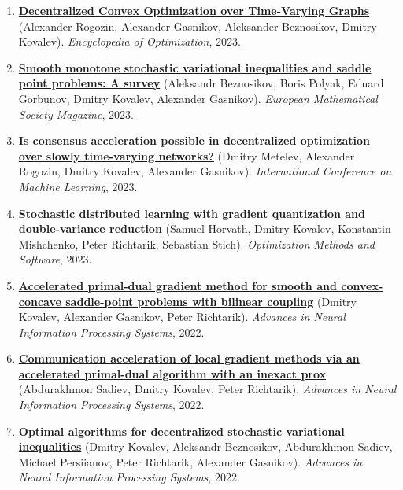 \begin{enumerate}
\item
\textbf{\href{https://link.springer.com/content/pdf/10.1007/978-3-030-54621-2_860-1.pdf}{Decentralized Convex Optimization over Time-Varying Graphs}} (Alexander Rogozin, Alexander Gasnikov, Aleksander Beznosikov, Dmitry Kovalev). \textit{Encyclopedia of Optimization}, 2023.
\item
\textbf{\href{https://ems.press/journals/mag/articles/9939904}{Smooth monotone stochastic variational inequalities and saddle point problems: A survey}} (Aleksandr Beznosikov, Boris Polyak, Eduard Gorbunov, Dmitry Kovalev, Alexander Gasnikov). \textit{European Mathematical Society Magazine}, 2023.
\item
\textbf{\href{https://proceedings.mlr.press/v202/metelev23a.html}{Is consensus acceleration possible in decentralized optimization over slowly time-varying networks?}} (Dmitry Metelev, Alexander Rogozin, Dmitry Kovalev, Alexander Gasnikov). \textit{International Conference on Machine Learning}, 2023.
\item
\textbf{\href{https://www.tandfonline.com/doi/abs/10.1080/10556788.2022.2117355}{Stochastic distributed learning with gradient quantization and double-variance reduction}} (Samuel Horvath, Dmitry Kovalev, Konstantin Mishchenko, Peter Richtarik, Sebastian Stich). \textit{Optimization Methods and Software}, 2023.
\item
\textbf{\href{https://proceedings.neurips.cc/paper_files/paper/2022/hash/883f66687a521536c505f9b2fbdcbf1e-Abstract-Conference.html}{Accelerated primal-dual gradient method for smooth and convex-concave saddle-point problems with bilinear coupling}} (Dmitry Kovalev, Alexander Gasnikov, Peter Richtarik). \textit{Advances in Neural Information Processing Systems}, 2022.
\item
\textbf{\href{https://proceedings.neurips.cc/paper_files/paper/2022/hash/88c3c482430a62d35e03926a22e4b67e-Abstract-Conference.html}{Communication acceleration of local gradient methods via an accelerated primal-dual algorithm with an inexact prox}} (Abdurakhmon Sadiev, Dmitry Kovalev, Peter Richtarik). \textit{Advances in Neural Information Processing Systems}, 2022.
\item
\textbf{\href{https://proceedings.neurips.cc/paper_files/paper/2022/hash/c959bb2cb164d37569a17fa67494d69a-Abstract-Conference.html}{Optimal algorithms for decentralized stochastic variational inequalities}} (Dmitry Kovalev, Aleksandr Beznosikov, Abdurakhmon Sadiev, Michael Persiianov, Peter Richtarik, Alexander Gasnikov). \textit{Advances in Neural Information Processing Systems}, 2022.

\end{enumerate}
